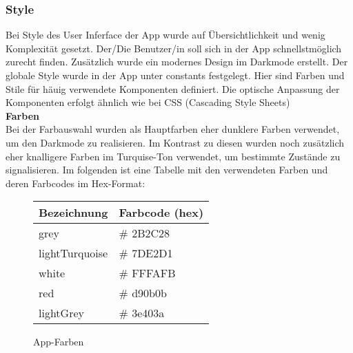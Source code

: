 \documentclass[11pt, twoside]{article}
\begin{document}
\subsubsection{Style}
Bei Style des User Inferface der App wurde auf Übersichtlichkeit und wenig Komplexität gesetzt. Der/Die Benutzer/in soll sich in der App schnellstmöglich zurecht finden. Zusätzlich wurde ein modernes Design im Darkmode erstellt. Der globale Style wurde in der App unter constants festgelegt. Hier sind Farben und Stile für häuig verwendete Komponenten definiert. Die optische Anpassung der Komponenten erfolgt ähnlich wie bei CSS (Cascading Style Sheets) \newline \\
\textbf{Farben} \\
Bei der Farbauswahl wurden als Hauptfarben eher dunklere Farben verwendet, um den Darkmode zu realisieren. Im Kontrast zu diesen wurden noch zusätzlich eher knalligere Farben im Turquise-Ton verwendet, um
bestimmte Zustände zu signalisieren. Im folgenden ist eine Tabelle mit den verwendeten Farben und deren Farbcodes im Hex-Format: \\
\begin{figure}[H]
\begin{tabular}{|l|l|}
\hline
\textbf{Bezeichnung} & \textbf{Farbcode (hex)} \\
\hline
grey & \# 2B2C28 \\
\hline 
lightTurquoise & \# 7DE2D1 \\
\hline 
white & \# FFFAFB \\
\hline 
red & \# d90b0b \\
\hline 
lightGrey & \# 3e403a \\
\hline 
\end{tabular} 
\caption{App-Farben}
\end{figure}
\end{document}
